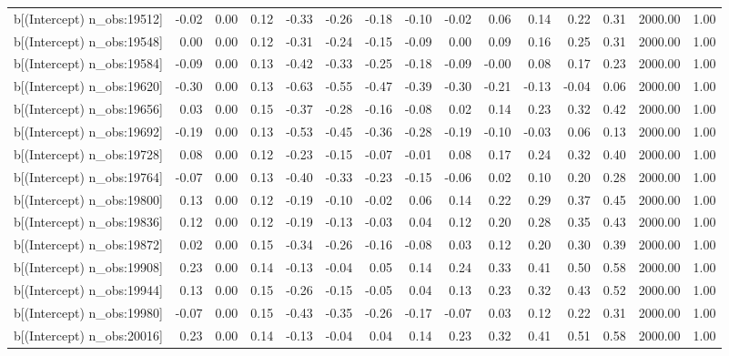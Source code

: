 \begin{table}[ht]
\begin{tabular}{rrrrrrrrrrrrrrr}
  b[(Intercept) n\_obs:19512] & -0.02 & 0.00 & 0.12 & -0.33 & -0.26 & -0.18 & -0.10 & -0.02 & 0.06 & 0.14 & 0.22 & 0.31 & 2000.00 & 1.00 \\ 
  b[(Intercept) n\_obs:19548] & 0.00 & 0.00 & 0.12 & -0.31 & -0.24 & -0.15 & -0.09 & 0.00 & 0.09 & 0.16 & 0.25 & 0.31 & 2000.00 & 1.00 \\ 
  b[(Intercept) n\_obs:19584] & -0.09 & 0.00 & 0.13 & -0.42 & -0.33 & -0.25 & -0.18 & -0.09 & -0.00 & 0.08 & 0.17 & 0.23 & 2000.00 & 1.00 \\ 
  b[(Intercept) n\_obs:19620] & -0.30 & 0.00 & 0.13 & -0.63 & -0.55 & -0.47 & -0.39 & -0.30 & -0.21 & -0.13 & -0.04 & 0.06 & 2000.00 & 1.00 \\ 
  b[(Intercept) n\_obs:19656] & 0.03 & 0.00 & 0.15 & -0.37 & -0.28 & -0.16 & -0.08 & 0.02 & 0.14 & 0.23 & 0.32 & 0.42 & 2000.00 & 1.00 \\ 
  b[(Intercept) n\_obs:19692] & -0.19 & 0.00 & 0.13 & -0.53 & -0.45 & -0.36 & -0.28 & -0.19 & -0.10 & -0.03 & 0.06 & 0.13 & 2000.00 & 1.00 \\ 
  b[(Intercept) n\_obs:19728] & 0.08 & 0.00 & 0.12 & -0.23 & -0.15 & -0.07 & -0.01 & 0.08 & 0.17 & 0.24 & 0.32 & 0.40 & 2000.00 & 1.00 \\ 
  b[(Intercept) n\_obs:19764] & -0.07 & 0.00 & 0.13 & -0.40 & -0.33 & -0.23 & -0.15 & -0.06 & 0.02 & 0.10 & 0.20 & 0.28 & 2000.00 & 1.00 \\ 
  b[(Intercept) n\_obs:19800] & 0.13 & 0.00 & 0.12 & -0.19 & -0.10 & -0.02 & 0.06 & 0.14 & 0.22 & 0.29 & 0.37 & 0.45 & 2000.00 & 1.00 \\ 
  b[(Intercept) n\_obs:19836] & 0.12 & 0.00 & 0.12 & -0.19 & -0.13 & -0.03 & 0.04 & 0.12 & 0.20 & 0.28 & 0.35 & 0.43 & 2000.00 & 1.00 \\ 
  b[(Intercept) n\_obs:19872] & 0.02 & 0.00 & 0.15 & -0.34 & -0.26 & -0.16 & -0.08 & 0.03 & 0.12 & 0.20 & 0.30 & 0.39 & 2000.00 & 1.00 \\ 
  b[(Intercept) n\_obs:19908] & 0.23 & 0.00 & 0.14 & -0.13 & -0.04 & 0.05 & 0.14 & 0.24 & 0.33 & 0.41 & 0.50 & 0.58 & 2000.00 & 1.00 \\ 
  b[(Intercept) n\_obs:19944] & 0.13 & 0.00 & 0.15 & -0.26 & -0.15 & -0.05 & 0.04 & 0.13 & 0.23 & 0.32 & 0.43 & 0.52 & 2000.00 & 1.00 \\ 
  b[(Intercept) n\_obs:19980] & -0.07 & 0.00 & 0.15 & -0.43 & -0.35 & -0.26 & -0.17 & -0.07 & 0.03 & 0.12 & 0.22 & 0.31 & 2000.00 & 1.00 \\ 
  b[(Intercept) n\_obs:20016] & 0.23 & 0.00 & 0.14 & -0.13 & -0.04 & 0.04 & 0.14 & 0.23 & 0.32 & 0.41 & 0.51 & 0.58 & 2000.00 & 1.00 \\ 

\end{tabular}
\end{table}
